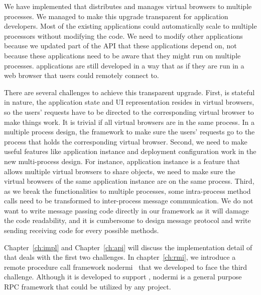 We have implemented \cbtwo that distributes and manages virtual browsers
to multiple processes.
We managed to make this upgrade transparent for application developers.
Most of the existing applications could automatically scale to 
multiple processors without modifying the code.
We need to modify other applications because we updated part of
the \cb{} API that these applications depend on,
not because these applications need to be aware that they might run on
multiple processes.
\cb{} applications are still developed in a way that as if they are run in
a web browser that users could remotely connect to.

There are several challenges to achieve this transparent upgrade.
First, \cb{} is stateful in nature, 
the application state and UI representation resides in virtual browsers,
so the users' requests have to be directed to the corresponding virtual browser
to make things work.
It is trivial if all virtual browsers are in the same process.
In a multiple process design,
the framework to make sure the users' requests go to the process that holds the
corresponding virtual browser.
Second, we need to make useful features like application instance and
deployment configuration work in the new multi-process design.
For instance, application instance is a feature that allows multiple virtual browsers
to share objects, we need to make sure the virtual browsers of the same application 
instance are on the same process.
Third, as we break the functionalities to multiple processes,
some intra-process method calls need to be transformed to inter-process message
communication.
We do not want to write message passing code directly in our framework as it
will damage the code readability, and it is cumbersome to design message protocol
and write sending receiving code for every possible methods.

Chapter~\ref{ch:impl} and Chapter~\ref{ch:api} will discuss the implementation detail
of \cbtwo that deals with the first two challenges.
In chapter~\ref{ch:rmi}, 
we introduce a remote procedure call framework nodermi~\cite{nodermi} that we developed
to face the third challenge.
Although it is developed to support \cbtwo,
nodermi is a general purpose RPC framework that could be utilized by
any \nodejs project.
